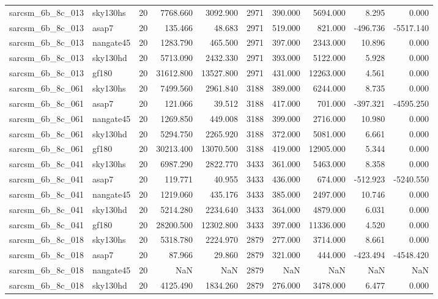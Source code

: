 \documentclass{article}
\begin{document}
\begin{longtable}{llrrrrrrrr}
sarcsm\_6b\_8c\_013 & sky130hs & 20 & 7768.660 & 3092.900 & 2971 & 390.000 & 5694.000 & 8.295 & 0.000 \\
sarcsm\_6b\_8c\_013 & asap7 & 20 & 135.466 & 48.683 & 2971 & 519.000 & 821.000 & -496.736 & -5517.140 \\
sarcsm\_6b\_8c\_013 & nangate45 & 20 & 1283.790 & 465.500 & 2971 & 397.000 & 2343.000 & 10.896 & 0.000 \\
sarcsm\_6b\_8c\_013 & sky130hd & 20 & 5713.090 & 2432.330 & 2971 & 393.000 & 5122.000 & 5.928 & 0.000 \\
sarcsm\_6b\_8c\_013 & gf180 & 20 & 31612.800 & 13527.800 & 2971 & 431.000 & 12263.000 & 4.561 & 0.000 \\
sarcsm\_6b\_8c\_061 & sky130hs & 20 & 7499.560 & 2961.840 & 3188 & 389.000 & 6244.000 & 8.735 & 0.000 \\
sarcsm\_6b\_8c\_061 & asap7 & 20 & 121.066 & 39.512 & 3188 & 417.000 & 701.000 & -397.321 & -4595.250 \\
sarcsm\_6b\_8c\_061 & nangate45 & 20 & 1269.850 & 449.008 & 3188 & 399.000 & 2716.000 & 10.980 & 0.000 \\
sarcsm\_6b\_8c\_061 & sky130hd & 20 & 5294.750 & 2265.920 & 3188 & 372.000 & 5081.000 & 6.661 & 0.000 \\
sarcsm\_6b\_8c\_061 & gf180 & 20 & 30213.400 & 13070.500 & 3188 & 419.000 & 12905.000 & 5.344 & 0.000 \\
sarcsm\_6b\_8c\_041 & sky130hs & 20 & 6987.290 & 2822.770 & 3433 & 361.000 & 5463.000 & 8.358 & 0.000 \\
sarcsm\_6b\_8c\_041 & asap7 & 20 & 119.771 & 40.955 & 3433 & 436.000 & 674.000 & -512.923 & -5240.550 \\
sarcsm\_6b\_8c\_041 & nangate45 & 20 & 1219.060 & 435.176 & 3433 & 385.000 & 2497.000 & 10.746 & 0.000 \\
sarcsm\_6b\_8c\_041 & sky130hd & 20 & 5214.280 & 2234.640 & 3433 & 364.000 & 4879.000 & 6.031 & 0.000 \\
sarcsm\_6b\_8c\_041 & gf180 & 20 & 28200.500 & 12302.800 & 3433 & 397.000 & 11336.000 & 4.520 & 0.000 \\
sarcsm\_6b\_8c\_018 & sky130hs & 20 & 5318.780 & 2224.970 & 2879 & 277.000 & 3714.000 & 8.661 & 0.000 \\
sarcsm\_6b\_8c\_018 & asap7 & 20 & 87.966 & 29.860 & 2879 & 321.000 & 444.000 & -423.494 & -4548.420 \\
sarcsm\_6b\_8c\_018 & nangate45 & 20 & NaN & NaN & 2879 & NaN & NaN & NaN & NaN \\
sarcsm\_6b\_8c\_018 & sky130hd & 20 & 4125.490 & 1834.260 & 2879 & 276.000 & 3478.000 & 6.477 & 0.000 \\

\end{longtable}
\end{document}
